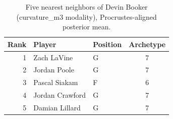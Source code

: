 \begin{table}[htbp]
  \centering\small
  \begin{tabular}{rllc}
    \toprule
    Rank & Player & Position & Archetype \\
    \midrule
    1 & Zach LaVine & G & 7 \\
    2 & Jordan Poole & G & 7 \\
    3 & Pascal Siakam & F & 6 \\
    4 & Jordan Crawford & G & 7 \\
    5 & Damian Lillard & G & 7 \\
    \bottomrule
  \end{tabular}
  \caption{Five nearest neighbors of Devin Booker (curvature_m3 modality), Procrustes-aligned posterior mean.}
  \label{tab:Devin_Booker_neighbors_curvature_m3}
\end{table}

